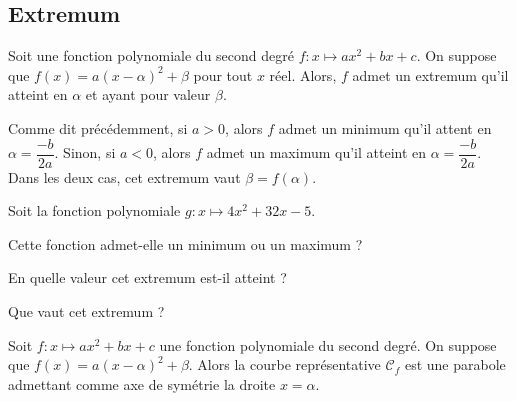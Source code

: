 \documentclass{article}
\begin{document}
\subsection{Extremum}
\begin{tcolorbox}    
\begin{proposition}
Soit une fonction polynomiale du second degré $f : x \mapsto ax^2 + bx + c$. On suppose que $f(x) = a(x - \alpha)^2 + \beta$ pour tout $x$ réel. Alors, $f$ admet un extremum qu'il atteint en $\alpha$ et ayant pour valeur $\beta$.    
\end{proposition}
\end{tcolorbox}
    \begin{remark}
Comme dit précédemment, si $a > 0$, alors $f$ admet un minimum qu'il attent en $\alpha = \dfrac{-b}{2a}$. Sinon, si $a < 0$, alors $f$ admet un maximum qu'il atteint en $\alpha = \dfrac{-b}{2a}$. Dans les deux cas, cet extremum vaut $\beta = f(\alpha)$.
\end{remark}
\begin{example}
Soit la fonction polynomiale $g : x \mapsto 4x^2 + 32x - 5$.
\begin{enumquestions}
\item Cette fonction admet-elle un minimum ou un maximum ?
\item En quelle valeur cet extremum est-il atteint ?
\item Que vaut cet extremum ?
\end{enumquestions}
\emptybox{5cm}
\end{example}
\begin{proposition}
Soit $f : x \mapsto ax^2 + bx + c$ une fonction polynomiale du second degré. On suppose que $f(x) = a(x - \alpha)^2 + \beta$. Alors la courbe représentative $\mathcal{C}_f$ est une parabole admettant comme axe de symétrie la droite $x = \alpha$.
\end{proposition}
\end{document}
